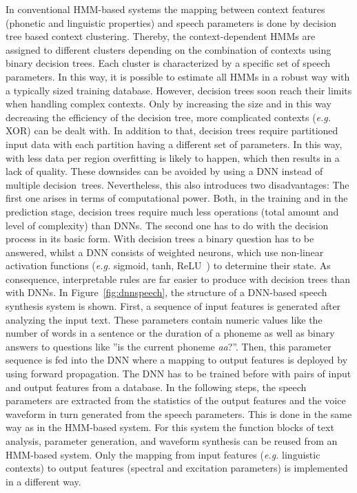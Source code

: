 In conventional \ac{HMM}-based systems the mapping between context features (phonetic and linguistic properties) and speech parameters is done by decision tree based context clustering. Thereby, the context-dependent \acp{HMM} are assigned to different clusters depending on the combination of contexts using binary decision trees. Each cluster is characterized by a specific set of speech parameters. In this way, it is possible to estimate all \acp{HMM} in a robust way with a typically sized training database. However, decision trees soon reach their limits when handling complex contexts. Only by increasing the size and in this way decreasing the efficiency of the decision tree, more complicated contexts (\textit{e.g.} XOR) can be dealt with. In addition to that, decision trees require partitioned input data with each partition having a different set of parameters. In this way, with less data per region overfitting is likely to happen, which then results in a lack of quality. These downsides can be avoided by using a \ac{DNN} instead of multiple decision~trees. Nevertheless, this also introduces two disadvantages: The first one arises in terms of computational power. Both, in the training and in the prediction stage, decision trees require much less operations (total amount and level of complexity) than \acp{DNN}. The second one has to do with the decision process in its basic form. With decision trees a binary question has to be answered, whilst a \ac{DNN} consists of weighted neurons, which use non-linear activation functions (\textit{e.g.} sigmoid, tanh, ReLU~\cite{chung:activation}) to determine their state. As consequence, interpretable rules are far easier to produce with decision trees than with \acp{DNN}.
In Figure~\ref{fig:dnnspeech}, the structure of a \ac{DNN}-based speech synthesis system is shown. First, a sequence of input features is generated after analyzing the input text. These parameters contain numeric values like the number of words in a sentence or the duration of a phoneme as well as binary answers to questions like ''is the current phoneme \textit{aa}?''. Then, this parameter sequence is fed into the \ac{DNN} where a mapping to output features is deployed by using forward propagation. The \ac{DNN} has to be trained before with pairs of input and output features from a database. In the following steps, the speech parameters are extracted from the statistics of the output features and the voice waveform in turn generated from the speech parameters. This is done in the same way as in the \ac{HMM}-based system. For this system the function blocks of text analysis, parameter generation, and waveform synthesis can be reused from an \ac{HMM}-based system. Only the mapping from input features (\textit{e.g.} linguistic contexts) to output features (spectral and excitation parameters) is implemented in a different way.


